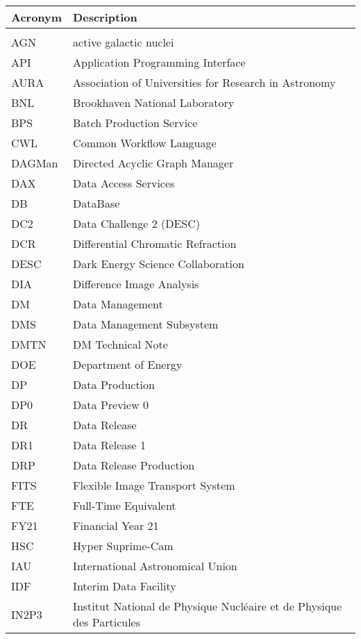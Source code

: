 \addtocounter{table}{-1}
\begin{longtable}{p{}p{}}\hline
\textbf{Acronym} & \textbf{Description}  \\\hline

 &  \\\hline
AGN & active galactic nuclei \\\hline
API & Application Programming Interface \\\hline
AURA & Association of Universities for Research in Astronomy \\\hline
BNL & Brookhaven National Laboratory \\\hline
BPS & Batch Production Service \\\hline
CWL & Common Workflow Language \\\hline
DAGMan & Directed Acyclic Graph Manager \\\hline
DAX & Data Access Services \\\hline
DB & DataBase \\\hline
DC2 & Data Challenge 2 (DESC) \\\hline
DCR & Differential Chromatic Refraction \\\hline
DESC & Dark Energy Science Collaboration \\\hline
DIA & Difference Image Analysis \\\hline
DM & Data Management \\\hline
DMS & Data Management Subsystem \\\hline
DMTN & DM Technical Note \\\hline
DOE & Department of Energy \\\hline
DP & Data Production \\\hline
DP0 & Data Preview 0 \\\hline
DR & Data Release \\\hline
DR1 & Data Release 1 \\\hline
DRP & Data Release Production \\\hline
FITS & Flexible Image Transport System \\\hline
FTE & Full-Time Equivalent \\\hline
FY21 & Financial Year 21 \\\hline
HSC & Hyper Suprime-Cam \\\hline
IAU & International Astronomical Union \\\hline
IDF & Interim Data Facility \\\hline
IN2P3 & Institut National de Physique Nucléaire et de Physique des Particules \\\hline

\end{longtable}
